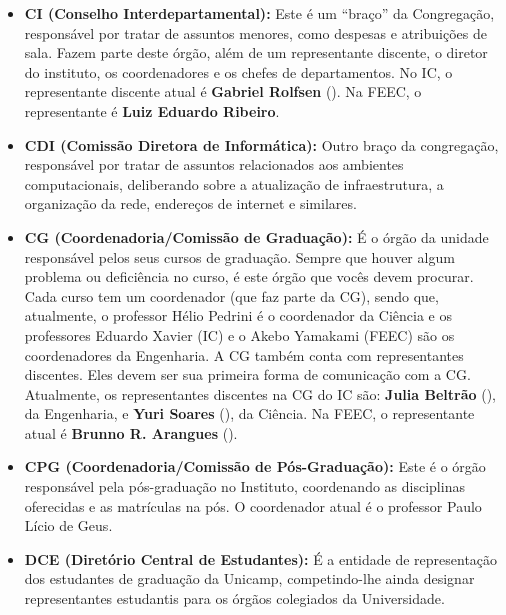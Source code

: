 \begin{itemize}
    \item  \textbf{CI (Conselho Interdepartamental):} Este é um ``braço'' da
        Congregação, responsável por tratar de assuntos menores, como despesas e
        atribuições de sala. Fazem parte deste órgão, além de um representante
        discente, o diretor do instituto, os coordenadores e os chefes de
        departamentos. No IC, o representante discente atual é \textbf{Gabriel
        Rolfsen} (). Na FEEC, o representante
        é \textbf{Luiz Eduardo Ribeiro}.

    \item  \textbf{CDI (Comissão Diretora de Informática):} Outro braço da
        congregação, responsável por tratar de assuntos relacionados aos
        ambientes computacionais, deliberando sobre a atualização de
        infraestrutura, a organização da rede, endereços de internet e
        similares.

    \item  \textbf{CG (Coordenadoria/Comissão de Graduação):} É o órgão da
        unidade responsável pelos seus cursos de graduação. Sempre que houver
        algum problema ou deficiência no curso, é este órgão que vocês devem
        procurar.  Cada curso tem um coordenador (que faz parte da CG), sendo
        que, atualmente, o professor Hélio Pedrini é o coordenador da Ciência e
        os professores Eduardo Xavier (IC) e o Akebo Yamakami (FEEC) são os
        coordenadores da Engenharia. A CG também conta com representantes
        discentes. Eles devem ser sua primeira forma de comunicação com a CG.
        Atualmente, os representantes discentes na CG do IC são: \textbf{Julia
        Beltrão} (), da Engenharia, e
        \textbf{Yuri Soares} (), da
        Ciência. Na FEEC, o representante atual é \textbf{Brunno R. Arangues}
        ().

    \item  \textbf{CPG (Coordenadoria/Comissão de Pós-Graduação):} Este é o
        órgão responsável pela pós-graduação no Instituto, coordenando as
        disciplinas oferecidas e as matrículas na pós. O coordenador atual é o
        professor Paulo Lício de Geus.

    \item  \textbf{DCE (Diretório Central de Estudantes):} É a entidade de
        representação dos estudantes de graduação da Unicamp, competindo-lhe
        ainda designar representantes estudantis para os órgãos colegiados da
        Universidade.


\end{itemize}
